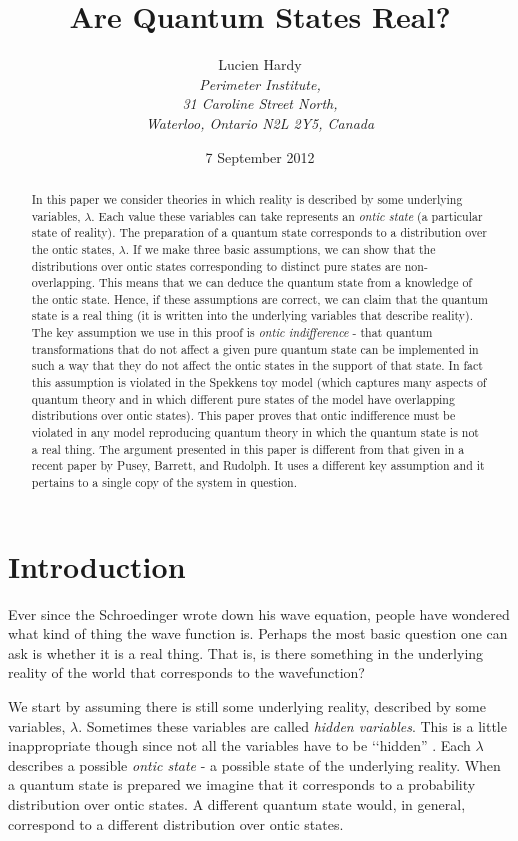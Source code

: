 \documentclass[12pt]{article}
\title{\Large \textbf{Are Quantum States Real?}}
\author{\normalsize Lucien Hardy\\[-2pt] \normalsize\textit{Perimeter Institute,}\\[-2pt] \normalsize\textit{31 Caroline Street North,}\\[-2pt] \normalsize\textit{Waterloo, Ontario N2L 2Y5, Canada}}
\date{\normalsize 7 September 2012}
\begin{document}
\maketitle


\begin{abstract} In this paper we consider theories in which reality is described by some underlying variables, $\lambda$.  Each
value these variables can take represents an \emph{ontic state} (a particular state of reality). The preparation of a quantum state corresponds to a distribution over the ontic states,
$\lambda$.   If we make three basic assumptions, we can show that the distributions over ontic states corresponding to distinct pure states are non-overlapping.  This means that we can deduce the quantum state from a knowledge of the ontic state. Hence, if these assumptions are correct, we can claim that the quantum state is a real thing (it is written into the underlying variables that describe reality).  The key assumption we use in this proof is \emph{ontic indifference} - that quantum transformations that do not affect a given pure quantum state can be implemented in such a way that they do not affect the ontic states in the support of that state.  In fact this assumption is violated in the Spekkens toy model (which captures many aspects of quantum theory and in which different pure states of the model have overlapping distributions over ontic states).   This paper proves that ontic indifference must be violated in any model reproducing quantum theory in which the quantum state is not a real thing.  The argument presented in this paper is different from that given in a recent paper by Pusey, Barrett, and Rudolph.  It uses a different key assumption and it pertains to a single copy of the system in question.
\end{abstract}

\newpage

\section{Introduction} \label{introduction}

Ever since the Schroedinger wrote down his wave equation, people have wondered what kind of thing the wave function is.  Perhaps the most basic question one can ask is whether it is a real
thing.  That is, is there something in the underlying reality of the world that corresponds to the wavefunction?

We start by assuming there is still some underlying reality, described by some variables, $\lambda$.  Sometimes these variables are called \emph{hidden variables}.  This is a little
inappropriate though since not all the variables have to be \lq\lq hidden'' \cite{bell2004speakable}.  Each $\lambda$ describes a possible \emph{ontic state} - a possible state of the
underlying reality.  When a quantum state is prepared we imagine that it corresponds to a probability distribution over ontic states.  A different quantum state would, in general, correspond
to a different distribution over ontic states.
\end{document}
